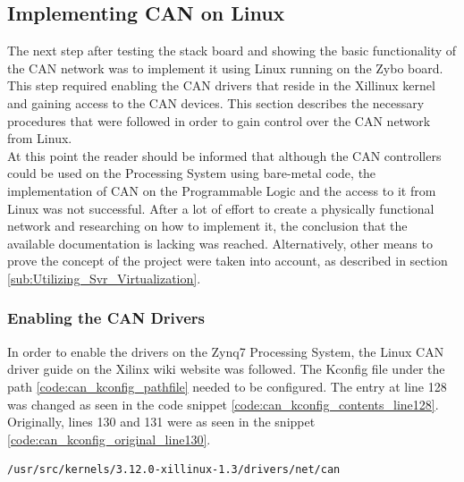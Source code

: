 \subsection{Implementing CAN on Linux}

The next step after testing the stack board and showing the basic functionality of the CAN network was to implement it using Linux running on the Zybo board.
This step required enabling the CAN drivers that reside in the Xillinux kernel and gaining access to the CAN devices.
This section describes the necessary procedures that were followed in order to gain control over the CAN network from Linux.
\\
At this point the reader should be informed that although the CAN controllers could be used on the Processing System using bare-metal code, the implementation of CAN on the Programmable Logic and the access to it from Linux was not successful.
After a lot of effort to create a physically functional network and researching on how to implement it, the conclusion that the available documentation is lacking was reached. 
Alternatively, other means to prove the concept of the project were taken into account, as described in section \ref{sub:Utilizing_Svr_Virtualization}.

\subsubsection{Enabling the CAN Drivers}

In order to enable the drivers on the Zynq7 Processing System, the Linux CAN driver guide \cite{Xilinx_wiki_Linux_CAN_driver} on the Xilinx wiki website \cite{Xilinx_wiki} was followed.
The Kconfig file under the path \ref{code:can_kconfig_pathfile} needed to be configured.
The entry at line 128 was changed as seen in the code snippet \ref{code:can_kconfig_contents_line128}.
Originally, lines 130 and 131 were as seen in the snippet \ref{code:can_kconfig_original_line130}.

\begin{lstlisting}[caption={CAN Kconfig pathfile.},numbers=none,label=code:can_kconfig_pathfile]
/usr/src/kernels/3.12.0-xillinux-1.3/drivers/net/can
\end{lstlisting}


